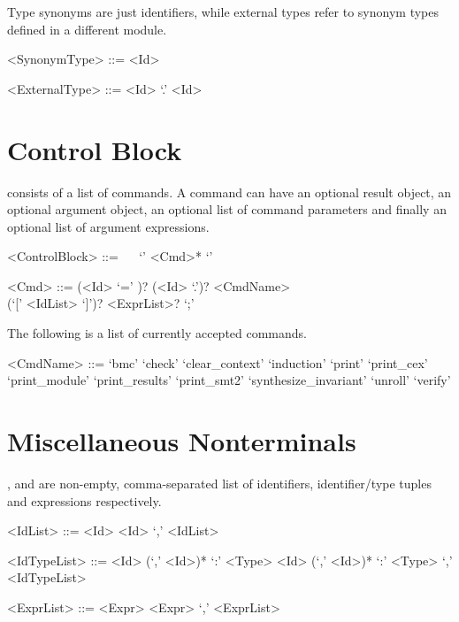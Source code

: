 Type synonyms are just identifiers, while external types refer to synonym types defined in a different module.
\begin{grammar}
    <SynonymType> ::= <Id>

    <ExternalType> ::= <Id> `.' <Id>
\end{grammar}

\section{Control Block}
 consists of a list of commands. A command can have an optional result object, an optional argument object, an optional list of command parameters and finally an optional list of argument expressions. 
\begin{grammar}
     <ControlBlock> ::= ~~ `{' <Cmd>* `}'

     <Cmd> ::= (<Id> `=' )? (<Id> `.')? <CmdName> \\
              (`[' <IdList> `]')? <ExprList>? `;'
\end{grammar}


The following is a list of currently accepted commands.

\begin{grammar}
    <CmdName> ::= `bmc' \alt
                  `check' \alt
                  `clear\_context' \alt
                  `induction' \alt
                  `print' \alt
                  `print\_cex' \alt
                  `print\_module' \alt
                  `print\_results' \alt
                  `print\_smt2'
                  `synthesize\_invariant' \alt
                  `unroll' \alt
                  `verify'
\end{grammar}

\section{Miscellaneous Nonterminals} 

,  and  are non-empty, comma-separated list of identifiers, identifier/type tuples and expressions respectively.
\begin{grammar}
     <IdList> ::= <Id> \alt <Id> `,' <IdList>

     <IdTypeList> ::=  <Id> (`,' <Id>)* `:' <Type> 
                  \alt <Id> (`,' <Id>)* `:' <Type> `,' <IdTypeList>

     <ExprList> ::=  <Expr>
                \alt <Expr> `,' <ExprList>
\end{grammar}

